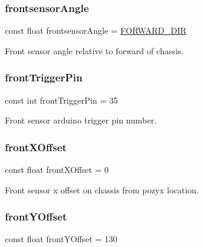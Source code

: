 \subsubsection{\texorpdfstring{frontsensor\+Angle}{frontsensorAngle}}
{\footnotesize\ttfamily const float frontsensor\+Angle = \mbox{\hyperlink{bot_main_8ino_afb3e7729ac5d0aab2fec8a9cc664e576}{F\+O\+R\+W\+A\+R\+D\+\_\+\+D\+IR}}}



Front sensor angle relative to forward of chassis. 

\mbox{\label{bot_main_8ino_ae091a21fa97656ee7bd8c5f79c45b752}} 
\subsubsection{\texorpdfstring{front\+Trigger\+Pin}{frontTriggerPin}}
{\footnotesize\ttfamily const int front\+Trigger\+Pin = 35}



Front sensor arduino trigger pin number. 

\mbox{\label{bot_main_8ino_abdd898a2dfa2f64e2821af36c6ed3724}} 
\subsubsection{\texorpdfstring{front\+X\+Offset}{frontXOffset}}
{\footnotesize\ttfamily const float front\+X\+Offset = 0}



Front sensor x offset on chassis from pozyx location. 

\mbox{\label{bot_main_8ino_a4919465d0182f44aa7acaa39ece1e17a}} 
\subsubsection{\texorpdfstring{front\+Y\+Offset}{frontYOffset}}
{\footnotesize\ttfamily const float front\+Y\+Offset = 130}



